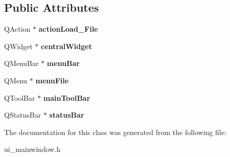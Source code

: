 \subsection*{Public Attributes}
\begin{DoxyCompactItemize}
\item 
\hypertarget{class_ui___main_window_a16f32a4d685b6eca5e99051ffdaaa49d}{Q\+Action $\ast$ {\bfseries action\+Load\+\_\+\+File}}\label{class_ui___main_window_a16f32a4d685b6eca5e99051ffdaaa49d}

\item 
\hypertarget{class_ui___main_window_a30075506c2116c3ed4ff25e07ae75f81}{Q\+Widget $\ast$ {\bfseries central\+Widget}}\label{class_ui___main_window_a30075506c2116c3ed4ff25e07ae75f81}

\item 
\hypertarget{class_ui___main_window_a2be1c24ec9adfca18e1dcc951931457f}{Q\+Menu\+Bar $\ast$ {\bfseries menu\+Bar}}\label{class_ui___main_window_a2be1c24ec9adfca18e1dcc951931457f}

\item 
\hypertarget{class_ui___main_window_a7ba84cb4cdd6a12dc83bf4e100bd8d80}{Q\+Menu $\ast$ {\bfseries menu\+File}}\label{class_ui___main_window_a7ba84cb4cdd6a12dc83bf4e100bd8d80}

\item 
\hypertarget{class_ui___main_window_a5172877001c8c7b4e0f6de50421867d1}{Q\+Tool\+Bar $\ast$ {\bfseries main\+Tool\+Bar}}\label{class_ui___main_window_a5172877001c8c7b4e0f6de50421867d1}

\item 
\hypertarget{class_ui___main_window_a50fa481337604bcc8bf68de18ab16ecd}{Q\+Status\+Bar $\ast$ {\bfseries status\+Bar}}\label{class_ui___main_window_a50fa481337604bcc8bf68de18ab16ecd}

\end{DoxyCompactItemize}


The documentation for this class was generated from the following file\+:\begin{DoxyCompactItemize}
\item 
ui\+\_\+mainwindow.\+h\end{DoxyCompactItemize}
